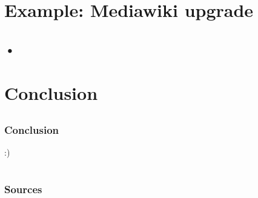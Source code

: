 \documentclass[11pt,compress]{beamer}
\begin{document}
\subsection{}
\begin{frame}

\end{frame}

\section{Example: Mediawiki upgrade}
\subsection{•}
\begin{frame}

\end{frame}

\section{Conclusion}
\subsection{}
\begin{frame}
\frametitle{Conclusion}
:)
\end{frame}

\section*{}
\begin{frame}
\frametitle{Sources}

\end{frame}
\end{document}
